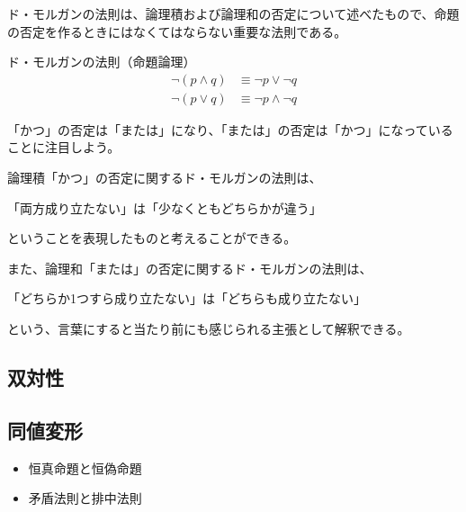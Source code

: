 \documentclass[../../imaging-math]{subfiles}
\begin{document}
ド・モルガンの法則は、論理積および論理和の否定について述べたもので、命題の否定を作るときにはなくてはならない重要な法則である。

\begin{theorem}{ド・モルガンの法則（命題論理）}
  \Large
  \begin{align*}
    \neg (p \land q) & \equiv \neg p \lor \neg q  \\
    \neg (p \lor q)  & \equiv \neg p \land \neg q
  \end{align*}
\end{theorem}

「かつ」の否定は「または」になり、「または」の否定は「かつ」になっていることに注目しよう。

\br

論理積「かつ」の否定に関するド・モルガンの法則は、
\begin{emphabox}
  \begin{spacebox}
    \begin{center}
      「両方成り立たない」は「少なくともどちらかが違う」
    \end{center}
  \end{spacebox}
\end{emphabox}
ということを表現したものと考えることができる。

\br

また、論理和「または」の否定に関するド・モルガンの法則は、
\begin{emphabox}
  \begin{spacebox}
    \begin{center}
      「どちらか1つすら成り立たない」は「どちらも成り立たない」
    \end{center}
  \end{spacebox}
\end{emphabox}
という、言葉にすると当たり前にも感じられる主張として解釈できる。

\subsection{双対性}

\subsection{同値変形}

\begin{mindflow}
  \begin{itemize}
    \item 恒真命題と恒偽命題
    \item 矛盾法則と排中法則
  \end{itemize}
\end{mindflow}
\end{document}
